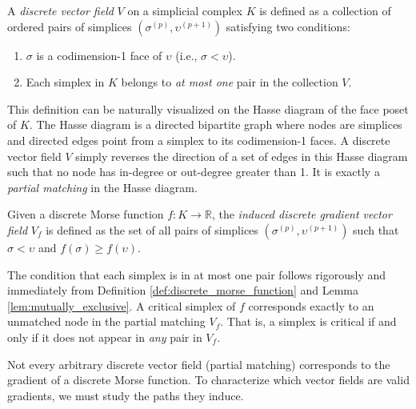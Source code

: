 \begin{definition}
\label{def:discrete_vector_field}
A \emph{discrete vector field} $V$ on a simplicial complex $K$ is defined as a collection of ordered pairs of simplices $(\sigma^{(p)}, \upsilon^{(p+1)})$ satisfying two conditions:
\begin{enumerate}
    \item $\sigma$ is a codimension-1 face of $\upsilon$ (i.e., $\sigma < \upsilon$).
    \item Each simplex in $K$ belongs to \emph{at most one} pair in the collection $V$.
\end{enumerate}
\end{definition}

This definition can be naturally visualized on the Hasse diagram of the face poset of $K$. The Hasse diagram is a directed bipartite graph where nodes are simplices and directed edges point from a simplex to its codimension-1 faces. A discrete vector field $V$ simply reverses the direction of a set of edges in this Hasse diagram such that no node has in-degree or out-degree greater than 1. It is exactly a \emph{partial matching} in the Hasse diagram.

\begin{definition}
Given a discrete Morse function $f: K \to \mathbb{R}$, the \emph{induced discrete gradient vector field} $V_f$ is defined as the set of all pairs of simplices $(\sigma^{(p)}, \upsilon^{(p+1)})$ such that $\sigma < \upsilon$ and $f(\sigma) \ge f(\upsilon)$. 
\end{definition}

The condition that each simplex is in at most one pair follows rigorously and immediately from Definition \ref{def:discrete_morse_function} and Lemma \ref{lem:mutually_exclusive}. A critical simplex of $f$ corresponds exactly to an unmatched node in the partial matching $V_f$. That is, a simplex is critical if and only if it does not appear in \emph{any} pair in $V_f$.

Not every arbitrary discrete vector field (partial matching) corresponds to the gradient of a discrete Morse function. To characterize which vector fields are valid gradients, we must study the paths they induce.

